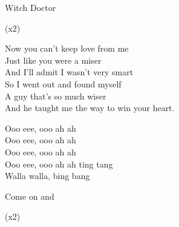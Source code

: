 \begin{song}{Witch Doctor}
\begin{SBChorus}
   (x2)
\end{SBChorus}

\begin{SBVerse}
  Now you can't keep love from me \\
  Just like you were a miser \\
  And I'll admit I wasn't very smart \\
  So I went out and found myself \\
  A guy that's so much wiser \\
  And he taught me the way to win your heart. \\
\end{SBVerse}

\begin{SBSection*}
Ooo eee, ooo ah ah \\
Ooo eee, ooo ah ah \\
Ooo eee, ooo ah ah \\
Ooo eee, ooo ah ah ting tang \\
Walla walla, bing bang \\ \medskip

Come on and
\end{SBSection*}

\begin{SBChorus}
   (x2)
\end{SBChorus}

\end{song}